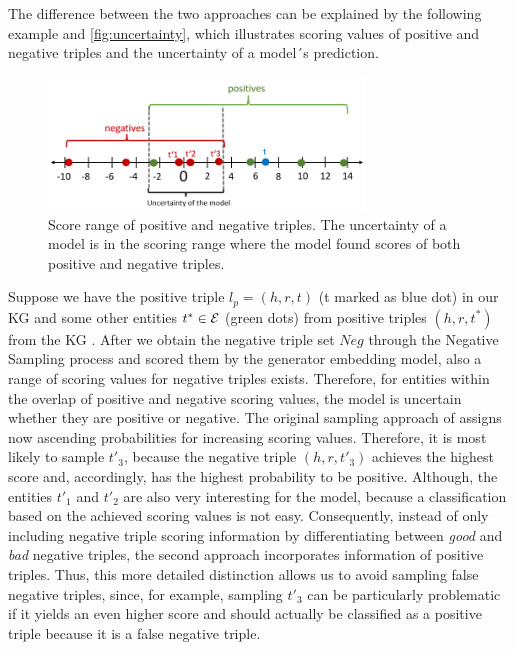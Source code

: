 The difference between the two approaches can be explained by the following example and \autoref{fig:uncertainty}, which illustrates scoring values of positive and negative triples and the uncertainty of a model´s prediction.
\begin{figure}[t]
  \centering
    \includegraphics[width=0.75\textwidth]{figures/uncertainty.PNG}
  \caption{Score range of positive and negative triples.
  The uncertainty of a model is in the scoring range where the model found scores of both positive and negative triples.}
  \label{fig:uncertainty}
\end{figure}
Suppose we have the positive triple $l_p=(h,r,t)$ (t marked as blue dot) in our KG and some other entities $t^* \in \mathcal{E}$ (green dots) from positive triples $(h,r,t^*)$ from the \ac{KG} .
After we obtain the negative triple set $Neg$ through the Negative Sampling process and scored them by the generator embedding model, also a range of scoring values for negative triples exists. 
Therefore, for entities within the overlap of positive and negative scoring values, the model is uncertain whether they are positive or negative.
The original sampling approach of \kbgan assigns now ascending probabilities for increasing scoring values.
Therefore, it is most likely to sample $t'_3$, because the negative triple $(h,r,t'_3)$ achieves the highest score and, accordingly, has the highest probability to be positive.
Although, the entities $t'_1$ and $t'_2$ are also very interesting for the model, because a classification based on the achieved scoring values is not easy.
Consequently, instead of only including negative triple scoring information by differentiating between \textit{good} and \textit{bad} negative triples, the second approach incorporates information of positive triples.
Thus, this more detailed distinction allows us to avoid sampling false negative triples, since, for example, sampling $t'_3$ can be particularly problematic if it yields an even higher score and should actually be classified as a positive triple because it is a false negative triple.

